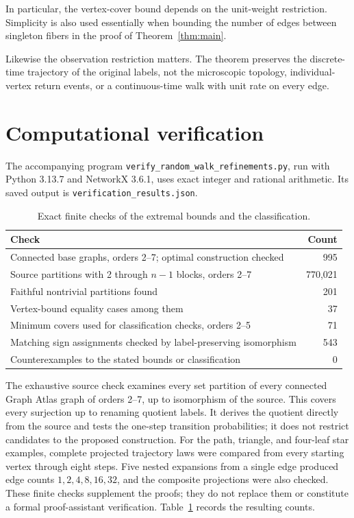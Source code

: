 \documentclass[11pt]{article}
\theoremstyle{definition}
\numberwithin{equation}{section}
\begin{document}
In particular, the vertex-cover bound depends on the unit-weight restriction.
Simplicity is also used essentially when bounding the number of edges
between singleton fibers in the proof of Theorem~\ref{thm:main}.

Likewise the observation restriction matters. The theorem preserves the
discrete-time trajectory of the original labels, not the microscopic
topology, individual-vertex return events, or a continuous-time walk with
unit rate on every edge.

\section{Computational verification}\label{sec:checks}

The accompanying program \texttt{verify\_random\_walk\_refinements.py}, run
with Python 3.13.7 and NetworkX 3.6.1, uses exact integer and rational
arithmetic. Its saved output is \texttt{verification\_results.json}.
\begin{table}[htbp]
\centering
\small
\caption{Exact finite checks of the extremal bounds and the classification.}
\label{tab:checks}
\begin{tabularx}{\textwidth}{@{}Xr@{}}
\toprule
Check & Count\\
\midrule
Connected base graphs, orders 2--7; optimal construction checked & 995\\
Source partitions with 2 through $n-1$ blocks, orders 2--7 & 770,021\\
Faithful nontrivial partitions found & 201\\
Vertex-bound equality cases among them & 37\\
Minimum covers used for classification checks, orders 2--5 & 71\\
Matching sign assignments checked by label-preserving isomorphism & 543\\
Counterexamples to the stated bounds or classification & 0\\
\bottomrule
\end{tabularx}
\end{table}

The exhaustive source check examines every set partition of every connected
Graph Atlas graph of orders 2--7, up to isomorphism of the source. This covers
every surjection up to renaming quotient labels. It derives the quotient
directly from the source and tests the one-step transition probabilities;
it does not restrict candidates to the proposed construction. For the path,
triangle, and four-leaf star examples, complete projected trajectory laws
were compared from every starting vertex through eight steps. Five nested
expansions from a single edge produced edge counts $1,2,4,8,16,32$, and the
composite projections were also checked. These finite checks supplement the
proofs; they do not replace them or constitute a formal proof-assistant
verification. Table~\ref{tab:checks} records the resulting counts.
\end{document}
